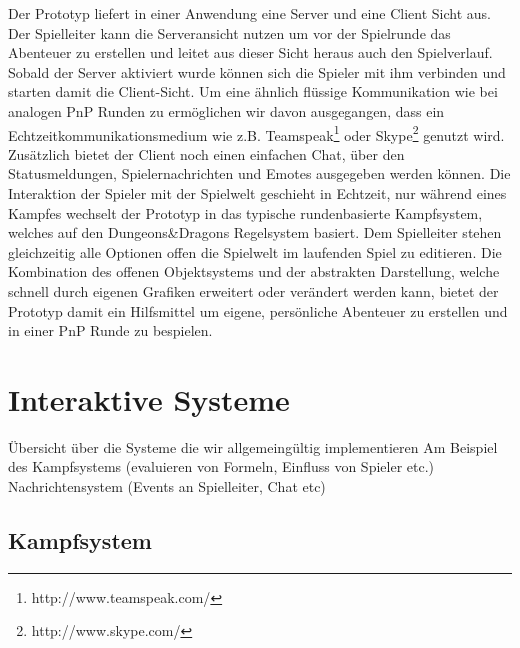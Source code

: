 Der Prototyp liefert in einer Anwendung eine Server und eine Client Sicht aus. Der Spielleiter kann die Serveransicht nutzen um vor der Spielrunde das Abenteuer zu erstellen und leitet aus dieser Sicht heraus auch den Spielverlauf. Sobald der Server aktiviert wurde können sich die Spieler mit ihm verbinden und starten damit die Client-Sicht. Um eine ähnlich flüssige Kommunikation wie bei analogen PnP Runden zu ermöglichen wir davon ausgegangen, dass ein Echtzeitkommunikationsmedium wie z.B. Teamspeak\footnote{http://www.teamspeak.com/} oder Skype\footnote{http://www.skype.com/} genutzt wird. Zusätzlich bietet der Client noch einen einfachen Chat, über den Statusmeldungen, Spielernachrichten und Emotes ausgegeben werden können. \newline
Die Interaktion der Spieler mit der Spielwelt geschieht in Echtzeit, nur während eines Kampfes wechselt der Prototyp in das typische rundenbasierte Kampfsystem, welches auf den Dungeons\&Dragons Regelsystem basiert. Dem Spielleiter stehen gleichzeitig alle Optionen offen die Spielwelt im laufenden Spiel zu editieren.\newline
Die Kombination des offenen Objektsystems und der abstrakten Darstellung, welche schnell durch eigenen Grafiken erweitert oder verändert werden kann, bietet der Prototyp damit ein Hilfsmittel um eigene, persönliche Abenteuer zu erstellen und in einer PnP Runde zu bespielen.




\section{Interaktive Systeme}
\label{sec:InteraktiveSysteme}
Übersicht über die Systeme die wir allgemeingültig implementieren\newline
Am Beispiel des Kampfsystems (evaluieren von Formeln, Einfluss von Spieler etc.)\newline
Nachrichtensystem (Events an Spielleiter, Chat etc)\newline

\subsection{Kampfsystem}
\label{sec:Kampfsystem}

